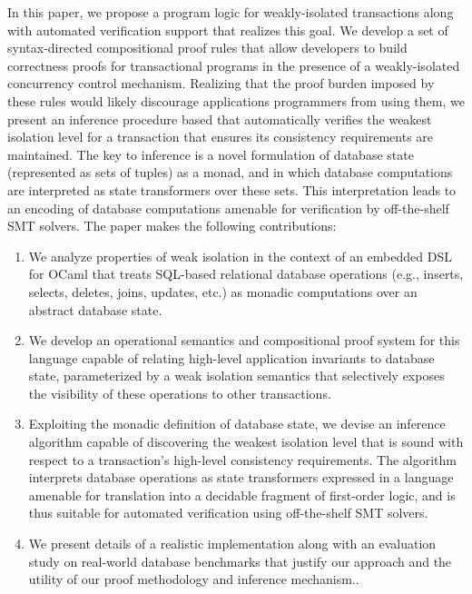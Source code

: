 In this paper, we propose a program logic for weakly-isolated
transactions along with automated verification support that realizes
this goal.  We develop a set of syntax-directed compositional proof
rules that allow developers to build correctness proofs for
transactional programs in the presence of a weakly-isolated
concurrency control mechanism.  Realizing that the proof burden
imposed by these rules would likely discourage applications
programmers from using them, we present an inference procedure based
that automatically verifies the weakest isolation level for a
transaction that ensures its consistency requirements are maintained.
The key to inference is a novel formulation of database state
(represented as sets of tuples) as a monad, and in which database
computations are interpreted as state transformers over these sets.
This interpretation leads to an encoding of database computations
amenable for verification by off-the-shelf SMT solvers.  The paper
makes the following contributions:
\begin{enumerate}
\item We analyze properties of weak isolation in the context of an
  embedded DSL for OCaml that treats SQL-based relational database
  operations (e.g., inserts, selects, deletes, joins, updates, etc.)
  as monadic computations over an abstract database state.
 \item We develop an operational semantics and compositional proof
   system for this language capable of relating high-level application
   invariants to database state, parameterized by a weak isolation
   semantics that selectively exposes the visibility of these
   operations to other transactions.
 \item Exploiting the monadic definition of database state, we devise
   an inference algorithm capable of discovering the weakest isolation
   level that is sound with respect to a transaction's high-level
   consistency requirements.  The algorithm interprets database
   operations as state transformers expressed in a language amenable
   for translation into a decidable fragment of first-order logic, and
   is thus suitable for automated verification using off-the-shelf SMT
   solvers.
 \item We present details of a realistic implementation along with an
   evaluation study on real-world database benchmarks that justify our
   approach and the utility of our proof methodology and inference
   mechanism..
\end{enumerate}
